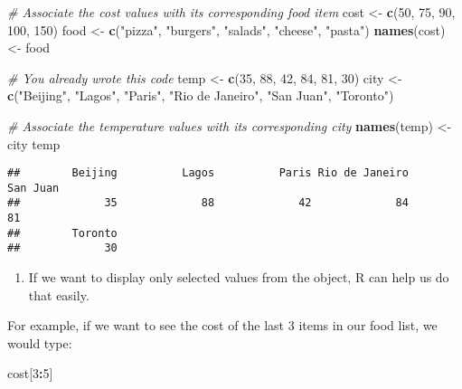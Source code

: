 \documentclass[
]{article}
\newenvironment{Shaded}{\begin{snugshade}}{\end{snugshade}}
\newcommand{\CommentTok}[1]{\textcolor[rgb]{0.56,0.35,0.01}{\textit{#1}}}
\newcommand{\DecValTok}[1]{\textcolor[rgb]{0.00,0.00,0.81}{#1}}
\newcommand{\KeywordTok}[1]{\textcolor[rgb]{0.13,0.29,0.53}{\textbf{#1}}}
\newcommand{\NormalTok}[1]{#1}
\newcommand{\OperatorTok}[1]{\textcolor[rgb]{0.81,0.36,0.00}{\textbf{#1}}}
\newcommand{\StringTok}[1]{\textcolor[rgb]{0.31,0.60,0.02}{#1}}
\providecommand{\tightlist}{%
  \setlength{\itemsep}{0pt}\setlength{\parskip}{0pt}}
\begin{document}
\begin{Shaded}
\begin{Highlighting}[]
\CommentTok{# Associate the cost values with its corresponding food item}
\NormalTok{cost <-}\StringTok{ }\KeywordTok{c}\NormalTok{(}\DecValTok{50}\NormalTok{, }\DecValTok{75}\NormalTok{, }\DecValTok{90}\NormalTok{, }\DecValTok{100}\NormalTok{, }\DecValTok{150}\NormalTok{)}
\NormalTok{food <-}\StringTok{ }\KeywordTok{c}\NormalTok{(}\StringTok{"pizza"}\NormalTok{, }\StringTok{"burgers"}\NormalTok{, }\StringTok{"salads"}\NormalTok{, }\StringTok{"cheese"}\NormalTok{, }\StringTok{"pasta"}\NormalTok{)}
\KeywordTok{names}\NormalTok{(cost) <-}\StringTok{ }\NormalTok{food}

\CommentTok{# You already wrote this code}
\NormalTok{temp <-}\StringTok{ }\KeywordTok{c}\NormalTok{(}\DecValTok{35}\NormalTok{, }\DecValTok{88}\NormalTok{, }\DecValTok{42}\NormalTok{, }\DecValTok{84}\NormalTok{, }\DecValTok{81}\NormalTok{, }\DecValTok{30}\NormalTok{)}
\NormalTok{city <-}\StringTok{ }\KeywordTok{c}\NormalTok{(}\StringTok{"Beijing"}\NormalTok{, }\StringTok{"Lagos"}\NormalTok{, }\StringTok{"Paris"}\NormalTok{, }\StringTok{"Rio de Janeiro"}\NormalTok{, }\StringTok{"San Juan"}\NormalTok{, }\StringTok{"Toronto"}\NormalTok{)}

\CommentTok{# Associate the temperature values with its corresponding city}
\KeywordTok{names}\NormalTok{(temp) <-}\StringTok{ }\NormalTok{city}
\NormalTok{temp}
\end{Highlighting}
\end{Shaded}

\begin{verbatim}
##        Beijing          Lagos          Paris Rio de Janeiro       San Juan 
##             35             88             42             84             81 
##        Toronto 
##             30
\end{verbatim}

\begin{enumerate}
\def\labelenumi{\arabic{enumi}.}
\setcounter{enumi}{3}
\tightlist
\item
  If we want to display only selected values from the object, R can help
  us do that easily.
\end{enumerate}

For example, if we want to see the cost of the last 3 items in our food
list, we would type:

\begin{Shaded}
\begin{Highlighting}[]
\NormalTok{cost[}\DecValTok{3}\OperatorTok{:}\DecValTok{5}\NormalTok{]}
\end{Highlighting}
\end{Shaded}
\end{document}
